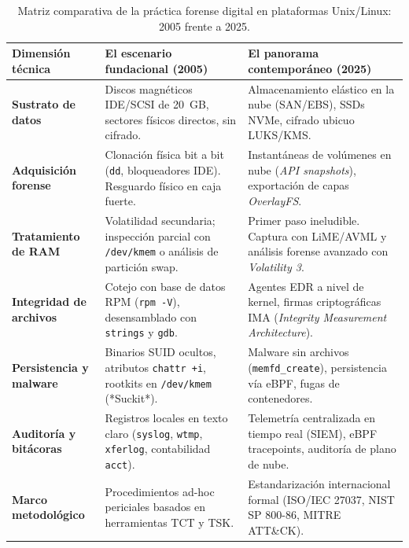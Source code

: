\begin{table}[htbp]
\centering
\scriptsize
\begin{tabularx}{\textwidth}{@{} l >{\raggedright\arraybackslash}X >{\raggedright\arraybackslash}X @{}}
\toprule
\textbf{Dimensión técnica} & \textbf{El escenario fundacional (2005)} & \textbf{El panorama contemporáneo (2025)} \\
\midrule
\textbf{Sustrato de datos} & Discos magnéticos IDE/SCSI de 20~GB, sectores físicos directos, sin cifrado. & Almacenamiento elástico en la nube (SAN/EBS), SSDs NVMe, cifrado ubicuo LUKS/KMS. \\
\addlinespace
\textbf{Adquisición forense} & Clonación física bit a bit (\texttt{dd}, bloqueadores IDE). Resguardo físico en caja fuerte. & Instantáneas de volúmenes en nube (\textit{API snapshots}), exportación de capas \textit{OverlayFS}. \\
\addlinespace
\textbf{Tratamiento de RAM} & Volatilidad secundaria; inspección parcial con \texttt{/dev/kmem} o análisis de partición swap. & Primer paso ineludible. Captura con LiME/AVML y análisis forense avanzado con \textit{Volatility 3}. \\
\addlinespace
\textbf{Integridad de archivos} & Cotejo con base de datos RPM (\texttt{rpm -V}), desensamblado con \texttt{strings} y \texttt{gdb}. & Agentes EDR a nivel de kernel, firmas criptográficas IMA (\textit{Integrity Measurement Architecture}). \\
\addlinespace
\textbf{Persistencia y malware} & Binarios SUID ocultos, atributos \texttt{chattr +i}, rootkits en \texttt{/dev/kmem} (*Suckit*). & Malware sin archivos (\texttt{memfd\_create}), persistencia vía eBPF, fugas de contenedores. \\
\addlinespace
\textbf{Auditoría y bitácoras} & Registros locales en texto claro (\texttt{syslog}, \texttt{wtmp}, \texttt{xferlog}, contabilidad \texttt{acct}). & Telemetría centralizada en tiempo real (SIEM), eBPF tracepoints, auditoría de plano de nube. \\
\addlinespace
\textbf{Marco metodológico} & Procedimientos ad-hoc periciales basados en herramientas TCT y TSK. & Estandarización internacional formal (ISO/IEC 27037, NIST SP 800-86, MITRE ATT\&CK). \\
\bottomrule
\end{tabularx}
\caption{Matriz comparativa de la práctica forense digital en plataformas Unix/Linux: 2005 frente a 2025.}
\label{tab:evolucion_forense_2005_2025}
\end{table}

